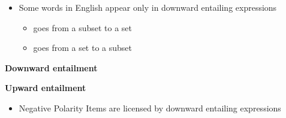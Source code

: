 \documentclass[headrule,footrule]{foils}
\begin{document}
\begin{itemize}
\item Some words in English appear only in downward entailing expressions
  \begin{itemize}
  \item {} goes from a subset to a set
  \item {} goes from a set to a subset
  \end{itemize}
\end{itemize}
\begin{exe}
  \ex
  \begin{xlist}
    \ex {} \ent  {}
    \ex {} \nent  {}
    \trans \textbf{Downward entailment}
    \end{xlist}
    \ex
  \begin{xlist}
    \ex {} \nent  {}
    \ex {} \ent  {}
    \trans \textbf{Upward entailment}
    \end{xlist}
  \end{exe}
  \begin{itemize}
  \item Negative Polarity Items are licensed by downward entailing expressions
  \end{itemize}


\end{document}
